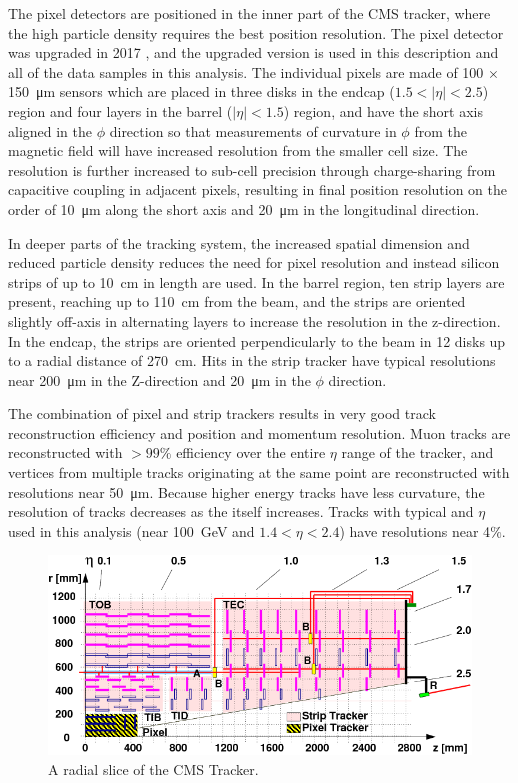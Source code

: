 The pixel detectors are positioned in the inner part of the CMS tracker, where the high particle density requires the best position resolution. 
The pixel detector was upgraded in 2017 \cite{pixelUpgrade}, and the upgraded version is used in this description and all of the data samples in this analysis. 
The individual pixels are made of 100 $\times$ \SI{150}{\micro\meter} sensors which are placed in three disks in the endcap ($1.5<\lvert\eta\rvert<2.5$) region and four layers in the barrel ($\lvert\eta\rvert<1.5$) region, and have the short axis aligned in the $\phi$ direction so that measurements of curvature in $\phi$ from the magnetic field will have increased resolution from the smaller cell size. 
The resolution is further increased to sub-cell precision through charge-sharing from capacitive coupling in adjacent pixels, resulting in final position resolution on the order of \SI{10}{\micro\meter} along the short axis and \SI{20}{\micro\meter} in the longitudinal direction.

In deeper parts of the tracking system, the increased spatial dimension and reduced particle density reduces the need for pixel resolution and instead silicon strips of up to \SI{10}{\centi\meter} in length are used. 
In the barrel region, ten strip layers are present, reaching up to \SI{110}{\centi\meter} from the beam, and the strips are oriented slightly off-axis in alternating layers to increase the resolution in the z-direction. 
In the endcap, the strips are oriented perpendicularly to the beam in 12 disks up to a radial distance of \SI{270}{\centi\meter}.
Hits in the strip tracker have typical resolutions near \SI{200}{\micro\meter} in the Z-direction and \SI{20}{\micro\meter} in the $\phi$ direction.

The combination of pixel and strip trackers results in very good track reconstruction efficiency and position and momentum resolution.
Muon tracks are reconstructed with $>99\%$ efficiency over the entire $\eta$ range of the tracker, and vertices from multiple tracks originating at the same point are reconstructed with resolutions near \SI{50}{\micro\meter}.
Because higher energy tracks have less curvature, the \pt resolution of tracks decreases as the \pt itself increases. Tracks with typical \pt and $\eta$ used in this analysis (\pt near \SI{100}{\giga\eV} and $1.4<\eta<2.4$) have resolutions near 4$\%$. 

\begin{figure}[htbp]
    \includegraphics[width=\textwidth]{figures/cms_tracker.png}
    \centering
    \caption{A radial slice of the CMS Tracker.}
    \label{fig:cmsTracker}
\end{figure}


